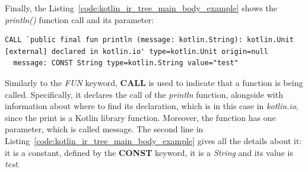 Finally, the Listing~\ref{code:kotlin_ir_tree_main_body_example} shows the \textit{println()} function call and its parameter:
\begin{lstlisting}[caption={Kotlin IR tree of the body block content of the main function in Listing~\ref{code:kotlin_for_ir_tree}}, captionpos=b, label={code:kotlin_ir_tree_main_body_example}]
CALL `public final fun println (message: kotlin.String): kotlin.Unit [external] declared in kotlin.io' type=kotlin.Unit origin=null
  message: CONST String type=kotlin.String value="test"
\end{lstlisting}
Similarly to the \textit{FUN} keyword, \textbf{CALL} is used to indicate that a function is being called. Specifically, it declares the call of the \textit{println} function, alongside with information about where to find its declaration, which is in this case in \textit{kotlin.io}, since the print is a Kotlin library function. Moreover, the function has one parameter, which is called message. The second line in Listing~\ref{code:kotlin_ir_tree_main_body_example} gives all the details about it: it is a constant, defined by the \textbf{CONST} keyword, it is a \textit{String} and its value is \textit{test}.

